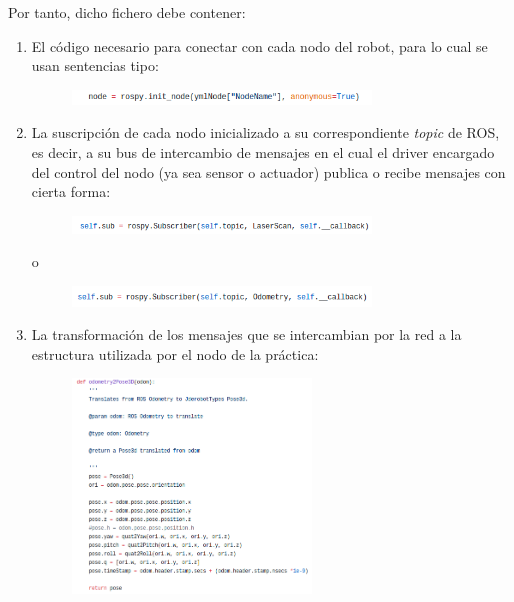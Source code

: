 Por tanto, dicho fichero debe contener:
\begin{enumerate}
	\item El código necesario para conectar con cada nodo del robot, para lo cual se usan sentencias tipo:
	\begin{figure}[H]
	\begin{center}
		\includegraphics[width=0.75\textwidth]{figures/initnode.png}
		\label{fig.initnode}
		\end{center}
	\end{figure}
	\item La suscripción de cada nodo inicializado a su correspondiente \textit{topic} de ROS, es decir, a su bus de intercambio de mensajes en el cual el driver encargado del control del nodo (ya sea sensor o actuador) publica o recibe mensajes con cierta forma:
	\begin{figure}[H]
	\begin{center}
		\includegraphics[width=0.75\textwidth]{figures/subscriberlaser.png}
		\label{fig.subscriberlaser}
		\end{center}
	\end{figure}
	\hspace{0.48\linewidth}o
	\begin{figure}[H]
	\begin{center}
		\includegraphics[width=0.75\textwidth]{figures/subscriberodometry.png}
		\label{fig.subscriberodometry}
		\end{center}
	\end{figure}
	\item La transformación de los mensajes que se intercambian por la red a la estructura utilizada por el nodo de la práctica:
	\begin{figure}[H]
	\begin{center}
		\includegraphics[width=0.60\textwidth]{figures/odom2pose.png}
		\label{fig.odometry2pose}
		\end{center}
	\end{figure}
\end{enumerate}

